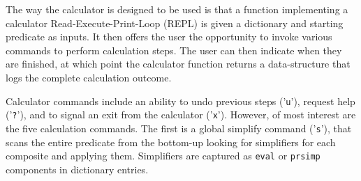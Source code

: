 The way the calculator is designed to be used is
that a function implementing a calculator Read-Execute-Print-Loop (REPL)
is given a dictionary and starting predicate as inputs.
It then offers the user the opportunity to invoke various
commands to perform calculation steps.
The user can then indicate when they are finished,
at which point the calculator function returns
a data-structure that logs the complete calculation outcome.

Calculator commands include an ability to undo previous steps ('\texttt{u}'),
request help ('\texttt{?}'),
and to signal an exit from the calculator ('\texttt{x}').
However,
of most interest are the five calculation commands.
The first is a global simplify command ('\texttt{s}'),
that scans the entire predicate from the bottom-up
looking for simplifiers for each composite and applying them.
Simplifiers are captured as \texttt{eval} or \texttt{prsimp} components
in dictionary entries.

